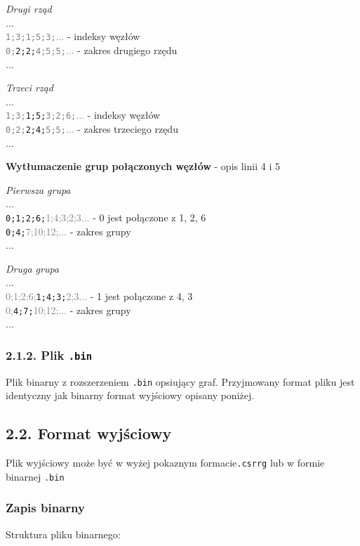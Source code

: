 \documentclass[]{article}
\begin{document}
\textit{Drugi rząd}\\
...\\
\textcolor{gray}{\texttt{1;3;1;5;3;}...} - indeksy węzłów\\
\textcolor{gray}{\texttt{0;}}\texttt{2;2;}\textcolor{gray}{\texttt{4;5;5;}...} - zakres drugiego rzędu\\
...

\textit{Trzeci rząd}\\
...\\
\textcolor{gray}{\texttt{1;3;}}\texttt{1;5;}\textcolor{gray}{\texttt{3;2;6;}...} - indeksy węzłów\\
\textcolor{gray}{\texttt{0;2;}}\texttt{2;4;}\textcolor{gray}{\texttt{5;5;}...} - zakres trzeciego rzędu\\
...

\textbf{Wytłumaczenie grup połączonych węzłów} - opis linii 4 i 5

\textit{Pierwsza grupa}\\
...\\
\texttt{0;1;2;6;}\textcolor{gray}{1;4;3;2;3...} - 0 jest połączone z 1, 2, 6\\
\texttt{0;4;}\textcolor{gray}{7;10;12;...} - zakres grupy\\
...

\textit{Druga grupa}\\
...\\
\textcolor{gray}{0;1;2;6;}\texttt{1;4;3;}\textcolor{gray}{2;3...} - 1 jest połączone z 4, 3\\
\textcolor{gray}{0;}\texttt{4;7;}\textcolor{gray}{10;12;...} - zakres grupy\\
...

\subsubsection{2.1.2. Plik \texttt{.bin}}

Plik binarny z rozszerzeniem \texttt{.bin} opsiujący graf. Przyjmowany format pliku jest identyczny jak binarny format wyjściowy opisany poniżej.

\subsection{2.2. Format wyjściowy}
Plik wyjściowy może być w wyżej pokaznym formacie\texttt{.csrrg}  lub w formie binarnej \texttt{.bin}
\subsubsection{Zapis binarny}
Struktura pliku binarnego:
\end{document}
